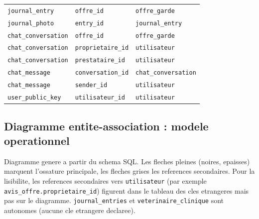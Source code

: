 \documentclass[11pt,a4paper]{article}
\begin{document}
\begin{longtable}{@{}lll@{}}
\texttt{journal\_entry} & \texttt{offre\_id} & \texttt{offre\_garde} \\
\texttt{journal\_photo} & \texttt{entry\_id} & \texttt{journal\_entry} \\
\texttt{chat\_conversation} & \texttt{offre\_id} & \texttt{offre\_garde} \\
\texttt{chat\_conversation} & \texttt{proprietaire\_id} & \texttt{utilisateur} \\
\texttt{chat\_conversation} & \texttt{prestataire\_id} & \texttt{utilisateur} \\
\texttt{chat\_message} & \texttt{conversation\_id} & \texttt{chat\_conversation} \\
\texttt{chat\_message} & \texttt{sender\_id} & \texttt{utilisateur} \\
\texttt{user\_public\_key} & \texttt{utilisateur\_id} & \texttt{utilisateur} \\
\bottomrule
\end{longtable}

\subsection{Diagramme entite-association : modele operationnel}
Diagramme genere a partir du schema SQL. Les fleches pleines (noires, epaisses)
marquent l'ossature principale, les fleches grises les references secondaires.
Pour la lisibilite, les references secondaires vers \texttt{utilisateur} (par
exemple \texttt{avis\_offre.proprietaire\_id}) figurent dans le tableau des
cles etrangeres mais pas sur le diagramme. \texttt{journal\_entries} et
\texttt{veterinaire\_clinique} sont autonomes (aucune cle etrangere declaree).

\begin{center}
\end{center}
\end{document}
